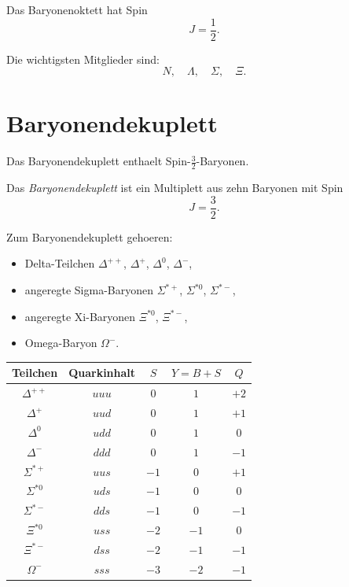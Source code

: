\begin{examtipbox}
Das Baryonenoktett hat Spin
\[
    J=\frac{1}{2}.
\]

Die wichtigsten Mitglieder sind:
\[
    N,\quad \Lambda,\quad \Sigma,\quad \Xi.
\]
\end{examtipbox}

\section{Baryonendekuplett}

Das Baryonendekuplett enthaelt Spin-$\frac{3}{2}$-Baryonen.

\begin{definitionbox}
Das \emph{Baryonendekuplett} ist ein Multiplett aus zehn Baryonen mit Spin
\[
    J=\frac{3}{2}.
\]
\end{definitionbox}

\begin{conceptbox}
Zum Baryonendekuplett gehoeren:
\begin{itemize}
    \item Delta-Teilchen $\Delta^{++}$, $\Delta^+$, $\Delta^0$, $\Delta^-$,
    \item angeregte Sigma-Baryonen $\Sigma^{*+}$, $\Sigma^{*0}$, $\Sigma^{*-}$,
    \item angeregte Xi-Baryonen $\Xi^{*0}$, $\Xi^{*-}$,
    \item Omega-Baryon $\Omega^-$.
\end{itemize}
\end{conceptbox}

\begin{center}
\begin{tabular}{|c|c|c|c|c|}
\hline
Teilchen & Quarkinhalt & $S$ & $Y=B+S$ & $Q$ \\
\hline
$\Delta^{++}$ & $uuu$ & $0$ & $1$ & $+2$ \\
\hline
$\Delta^{+}$ & $uud$ & $0$ & $1$ & $+1$ \\
\hline
$\Delta^{0}$ & $udd$ & $0$ & $1$ & $0$ \\
\hline
$\Delta^{-}$ & $ddd$ & $0$ & $1$ & $-1$ \\
\hline
$\Sigma^{*+}$ & $uus$ & $-1$ & $0$ & $+1$ \\
\hline
$\Sigma^{*0}$ & $uds$ & $-1$ & $0$ & $0$ \\
\hline
$\Sigma^{*-}$ & $dds$ & $-1$ & $0$ & $-1$ \\
\hline
$\Xi^{*0}$ & $uss$ & $-2$ & $-1$ & $0$ \\
\hline
$\Xi^{*-}$ & $dss$ & $-2$ & $-1$ & $-1$ \\
\hline
$\Omega^{-}$ & $sss$ & $-3$ & $-2$ & $-1$ \\
\hline
\end{tabular}
\end{center}

